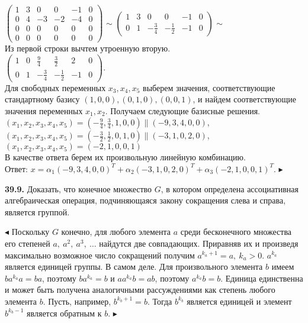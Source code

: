 \documentclass[a5paper,10pt]{article}
\begin{document}
$\left(\begin{array}{rrrrr|r}
1& 3& 0& 0& -1& 0\\
0& 4& -3& -2& -4& 0\\
0& 0& 0& 0& 0& 0\\
0& 0& 0& 0& 0& 0
\end{array}\right)$
$\sim$
$\left(\begin{array}{rrrrr|r}
1& 3& 0& 0& -1& 0\\
0& 1& -\frac34& -\frac12& -1& 0
\end{array}\right)$
$\sim$\\[3pt]
Из первой строки вычтем утроенную вторую.\\[3pt]
$\left(\begin{array}{rrrrr|r}
1& 0& \frac94& \frac32& 2& 0\\[3pt]
0& 1& -\frac34& -\frac12& -1& 0
\end{array}\right)$.\\[3pt]
Для свободных переменных $x_3,x_4,x_5$ выберем значения, соответствующие стандартному базису  $(1,0,0),(0,1,0),(0,0,1)$, и найдем соответствующие значения переменных $x_1,x_2$. Получаем следующие базисные решения.\\
$(x_1,x_2,x_3,x_4,x_5)=(-\frac94,\frac34,1,0,0)\parallel(-9,3,4,0,0)$,\\[3pt]
$(x_1,x_2,x_3,x_4,x_5)=(-\frac32,\frac12,0,1,0)\parallel(-3,1,0,2,0)$,\\[3pt]
$(x_1,x_2,x_3,x_4,x_5)=(-2,1,0,0,1)$\\
В качестве ответа берем их произвольную линейную комбинацию.\\
Ответ: $x=\alpha_1(-9,3,4,0,0)^T+\alpha_2(-3,1,0,2,0)^T+\alpha_3(-2,1,0,0,1)^T$.
$\blacktriangleright$

\bigskip
\noindent
{\bf 39.9.} Доказать, что конечное множество $G$, в котором определена ассоциативная алгебраическая операция, подчиняющаяся закону сокращения слева и справа, является группой.

\medskip
\noindent
$\blacktriangleleft$ Поскольку $G$ конечно, для любого элемента $a$ среди бесконечного множества его степеней $a,\ a^2,\ a^3,\ \ldots$ найдутся две совпадающих. Приравняв их и произведя максимально возможное число сокращений получим $a^{k_a+1}=a,\ k_a>0$. $a^{k_a}$ является единицей группы. В самом деле. Для произвольного элемента $b$ имеем $ba^{k_a}a=ba$, поэтому $ba^{k_a}=b$ и $aa^{k_a}b=ab$, поэтому $a^{k_a}b=b$. Единица единственна и может быть получена аналогичными рассуждениями как степень любого элемента $b$. Пусть, например, $b^{k_b+1}=b$. Тогда $b^{k_b}$ является единицей и элемент $b^{k_b-1}$ является обратным к $b$.
$\blacktriangleright$
\end{document}
